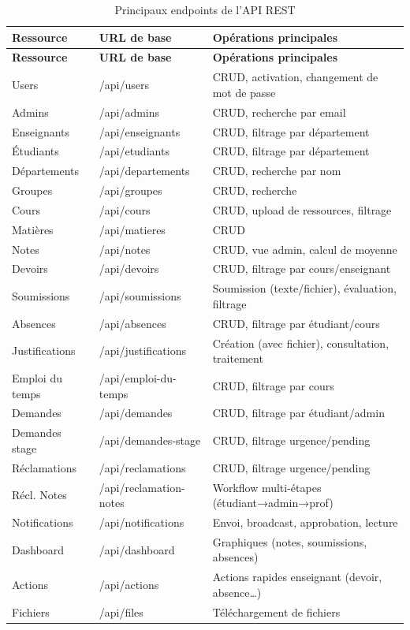 \begin{longtable}{llp{5.5cm}}
\caption{Principaux endpoints de l'API REST} \label{tab:endpoints} \\
\toprule
\textbf{Ressource} & \textbf{URL de base} & \textbf{Opérations principales} \\
\midrule
\endfirsthead

\toprule
\textbf{Ressource} & \textbf{URL de base} & \textbf{Opérations principales} \\
\midrule
\endhead

\bottomrule
\endfoot

Users & /api/users & CRUD, activation, changement de mot de passe \\
Admins & /api/admins & CRUD, recherche par email \\
Enseignants & /api/enseignants & CRUD, filtrage par département \\
Étudiants & /api/etudiants & CRUD, filtrage par département \\
Départements & /api/departements & CRUD, recherche par nom \\
Groupes & /api/groupes & CRUD, recherche \\
Cours & /api/cours & CRUD, upload de ressources, filtrage \\
Matières & /api/matieres & CRUD \\
Notes & /api/notes & CRUD, vue admin, calcul de moyenne \\
Devoirs & /api/devoirs & CRUD, filtrage par cours/enseignant \\
Soumissions & /api/soumissions & Soumission (texte/fichier), évaluation, filtrage \\
Absences & /api/absences & CRUD, filtrage par étudiant/cours \\
Justifications & /api/justifications & Création (avec fichier), consultation, traitement \\
Emploi du temps & /api/emploi-du-temps & CRUD, filtrage par cours \\
Demandes & /api/demandes & CRUD, filtrage par étudiant/admin \\
Demandes stage & /api/demandes-stage & CRUD, filtrage urgence/pending \\
Réclamations & /api/reclamations & CRUD, filtrage urgence/pending \\
Récl. Notes & /api/reclamation-notes & Workflow multi-étapes (étudiant→admin→prof) \\
Notifications & /api/notifications & Envoi, broadcast, approbation, lecture \\
Dashboard & /api/dashboard & Graphiques (notes, soumissions, absences) \\
Actions & /api/actions & Actions rapides enseignant (devoir, absence…) \\
Fichiers & /api/files & Téléchargement de fichiers \\
\end{longtable}

